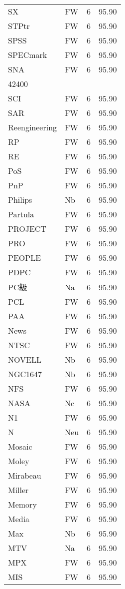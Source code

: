 \documentclass[twocolumn]{book}
\begin{document}
\begin{supertabular}{llrr}
SX & FW & 6 &  95.90\\
STPtr & FW & 6 &  95.90\\
SPSS & FW & 6 &  95.90\\
SPECmark & FW & 6 &  95.90\\
SNA & FW & 6 &  95.90\\
42400\\
SCI & FW & 6 &  95.90\\
SAR & FW & 6 &  95.90\\
Reengineering & FW & 6 &  95.90\\
RP & FW & 6 &  95.90\\
RE & FW & 6 &  95.90\\
PoS & FW & 6 &  95.90\\
PnP & FW & 6 &  95.90\\
Philips & Nb & 6 &  95.90\\
Partula & FW & 6 &  95.90\\
PROJECT & FW & 6 &  95.90\\
PRO & FW & 6 &  95.90\\
PEOPLE & FW & 6 &  95.90\\
PDPC & FW & 6 &  95.90\\
PC級 & Na & 6 &  95.90\\
PCL & FW & 6 &  95.90\\
PAA & FW & 6 &  95.90\\
News & FW & 6 &  95.90\\
NTSC & FW & 6 &  95.90\\
NOVELL & Nb & 6 &  95.90\\
NGC1647 & Nb & 6 &  95.90\\
NFS & FW & 6 &  95.90\\
NASA & Nc & 6 &  95.90\\
N1 & FW & 6 &  95.90\\
N & Neu & 6 &  95.90\\
Mosaic & FW & 6 &  95.90\\
Moley & FW & 6 &  95.90\\
Mirabeau & FW & 6 &  95.90\\
Miller & FW & 6 &  95.90\\
Memory & FW & 6 &  95.90\\
Media & FW & 6 &  95.90\\
Max & Nb & 6 &  95.90\\
MTV & Na & 6 &  95.90\\
MPX & FW & 6 &  95.90\\
MIS & FW & 6 &  95.90\\

\end{supertabular}
\end{document}
